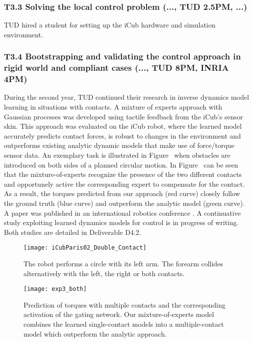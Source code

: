 \subsubsection*{T3.3 Solving the local control problem (..., TUD 2.5PM, ...)}

TUD hired a student for setting up the iCub hardware and simulation environment.
    

\subsubsection*{T3.4 Bootstrapping and validating the control approach in rigid world and compliant cases (..., TUD 8PM, INRIA 4PM)} 
    
During the second year, TUD continued their research in inverse dynamics model
learning in situations with contacts. A mixture of experts approach with
Gaussian processes was developed using tactile feedback from the iCub's sensor
skin. This approach was evaluated on the iCub robot, where the learned model
accurately predicts contact forces, is robust to changes in the environment and
outperforms existing analytic dynamic models that make use of force/torque
sensor data. 
An exemplary task is illustrated in Figure~\cite{fig:exp3:icuparis_experiment_bars} 
when obstacles are introduced on both sides of a planned circular motion.
In Figure~\cite{fig:exp3:gating} can be seen that the mixture-of-experts recognize the presence of the two different contacts and opportunely active the corresponding expert to compensate for the contact.
As a result, the torques predicted from our approach (red curve) closely follow the ground truth (blue curve) and outperform the analytic model (green curve).
A paper was published in an international robotics conference
\cite{Calandra_ICRA15}. A continuative study exploiting learned dynamics models
for control is in progress of writing. Both studies are detailed in Deliverable
D4.2.

	\begin{figure}[t]
		\begin{minipage}{.43\linewidth}
			\centering
			\texttt{[image: iCubParis02\_Double\_Contact]}
			\caption{The robot performs a circle with its left arm. 
			The forearm collides alternatively with the left, the right or both contacts.}
			\label{fig:exp3:icuparis_experiment_bars}
		\end{minipage}	
		\hfill
		\begin{minipage}{.52\linewidth}
			\centering
			\texttt{[image: exp3\_both]}
			\caption{Prediction of torques with multiple contacts and the corresponding activation of the gating network.
			Our mixture-of-experts model combines the learned single-contact models into a multiple-contact model which outperform the analytic approach.
			}
			\label{fig:exp3:gating}
		\end{minipage}	
	\end{figure}
	
